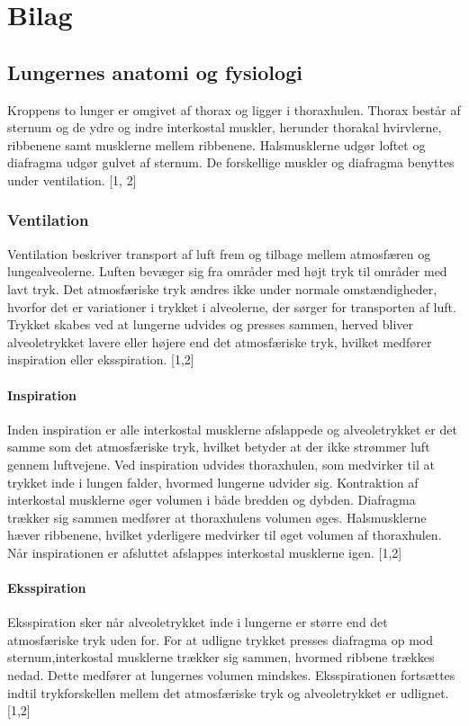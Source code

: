 \chapter{Bilag}
\section{Lungernes anatomi og fysiologi} \label{BilagA}
Kroppens to lunger er omgivet af thorax og ligger i thoraxhulen. Thorax består af sternum og de ydre og indre interkostal muskler, herunder thorakal hvirvlerne, ribbenene samt musklerne mellem ribbenene. Halsmusklerne udgør loftet og diafragma udgør gulvet af sternum. De forskellige muskler og diafragma benyttes under ventilation. [1, 2]

\subsection{Ventilation}
Ventilation beskriver transport af luft frem og tilbage mellem atmosfæren og lungealveolerne. Luften bevæger sig fra områder med højt tryk til områder med lavt tryk. Det atmosfæriske tryk ændres ikke under normale omstændigheder, hvorfor det er variationer i trykket i alveolerne, der sørger for transporten af luft. Trykket skabes ved at lungerne udvides og presses sammen, herved bliver alveoletrykket lavere eller højere end det atmosfæriske tryk, hvilket medfører inspiration eller eksspiration. [1,2]

\subsubsection{Inspiration}
Inden inspiration er alle interkostal musklerne afslappede og alveoletrykket er det samme som det atmosfæriske tryk, hvilket betyder at der ikke strømmer luft gennem luftvejene. Ved inspiration udvides thoraxhulen, som medvirker til at trykket inde i lungen falder, hvormed  lungerne udvider sig. Kontraktion af interkostal musklerne øger volumen i både bredden og dybden. Diafragma trækker sig sammen medfører at thoraxhulens volumen øges. Halsmusklerne hæver ribbenene, hvilket yderligere medvirker til øget volumen af thoraxhulen. Når inspirationen er afsluttet afslappes interkostal musklerne igen. [1,2]

\subsubsection{Eksspiration}
Eksspiration sker når alveoletrykket inde i lungerne er større end det atmosfæriske tryk uden for. For at udligne trykket presses diafragma op mod sternum,interkostal musklerne trækker sig sammen, hvormed ribbene trækkes nedad. Dette medfører at lungernes volumen mindskes. Eksspirationen fortsættes indtil trykforskellen mellem det atmosfæriske tryk og alveoletrykket er udlignet. [1,2]

